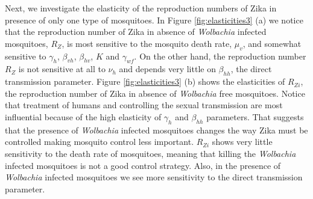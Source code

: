 \documentclass{ws-rv9x6}
\begin{document}
Next, we investigate the elasticity of the reproduction numbers of Zika in presence of only one type of mosquitoes. In Figure \ref{fig:elasticities3} (a) we notice that the reproduction number of Zika in absence of \textit{Wolbachia} infected mosquitoes, $R_Z$, is most sensitive to the mosquito death rate, $\mu_v$, and somewhat sensitive to $\gamma_h$, $\beta_{vh}$, $\beta_{hv}$, $K$ and $\gamma_{wf}.$ On the other hand, the reproduction number $R_Z$ is not sensitive at all to $\nu_h$ and depends very little on $\beta_{hh}$, the direct transmission parameter.    
Figure \ref{fig:elasticities3} (b) shows the elasticities of $R_{Zi}$, the reproduction number of Zika in absence of \textit{Wolbachia} free mosquitoes. 
Notice that treatment of humans and controlling the sexual transmission are most influential because of the high elasticity of $\gamma_h$ and $\beta_{hh}$  parameters. That suggests that the presence of \textit{Wolbachia} infected mosquitoes changes the way Zika must be controlled making mosquito control less important.
$R_{Zi}$ shows very little sensitivity to the death rate of mosquitoes, meaning that killing the \textit{Wolbachia} infected mosquitoes is not a good control strategy. Also, in the presence of \textit{Wolbachia} infected mosquitoes we see more sensitivity to the direct transmission parameter.
\end{document}
